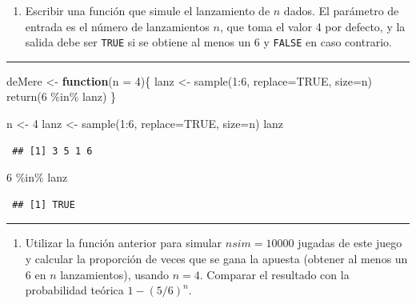 \documentclass[
]{book}
\newenvironment{Shaded}{\begin{snugshade}}{\end{snugshade}}
\newcommand{\AttributeTok}[1]{\textcolor[rgb]{0.77,0.63,0.00}{#1}}
\newcommand{\ConstantTok}[1]{\textcolor[rgb]{0.00,0.00,0.00}{#1}}
\newcommand{\ControlFlowTok}[1]{\textcolor[rgb]{0.13,0.29,0.53}{\textbf{#1}}}
\newcommand{\DecValTok}[1]{\textcolor[rgb]{0.00,0.00,0.81}{#1}}
\newcommand{\FunctionTok}[1]{\textcolor[rgb]{0.00,0.00,0.00}{#1}}
\newcommand{\NormalTok}[1]{#1}
\newcommand{\OtherTok}[1]{\textcolor[rgb]{0.56,0.35,0.01}{#1}}
\newcommand{\SpecialCharTok}[1]{\textcolor[rgb]{0.00,0.00,0.00}{#1}}
\providecommand{\tightlist}{%
  \setlength{\itemsep}{0pt}\setlength{\parskip}{0pt}}
\theoremstyle{break}
\theoremstyle{nonumberplain}
\begin{document}
\begin{enumerate}
\def\labelenumi{\alph{enumi})}
\tightlist
\item
  Escribir una función que simule el lanzamiento de \(n\) dados. El
  parámetro de entrada es el número de lanzamientos \(n\), que toma
  el valor 4 por defecto, y la salida debe ser \texttt{TRUE} si se
  obtiene al menos un 6 y \texttt{FALSE} en caso contrario.
\end{enumerate}

\begin{center}\rule{0.5\linewidth}{0.5pt}\end{center}

\begin{Shaded}
\begin{Highlighting}[]
\NormalTok{deMere }\OtherTok{\textless{}{-}} \ControlFlowTok{function}\NormalTok{(}\AttributeTok{n =} \DecValTok{4}\NormalTok{)\{}
\NormalTok{  lanz }\OtherTok{\textless{}{-}} \FunctionTok{sample}\NormalTok{(}\DecValTok{1}\SpecialCharTok{:}\DecValTok{6}\NormalTok{, }\AttributeTok{replace=}\ConstantTok{TRUE}\NormalTok{, }\AttributeTok{size=}\NormalTok{n)}
  \FunctionTok{return}\NormalTok{(}\DecValTok{6} \SpecialCharTok{\%in\%}\NormalTok{ lanz)}
\NormalTok{\}}

\NormalTok{n }\OtherTok{\textless{}{-}} \DecValTok{4}
\NormalTok{lanz }\OtherTok{\textless{}{-}} \FunctionTok{sample}\NormalTok{(}\DecValTok{1}\SpecialCharTok{:}\DecValTok{6}\NormalTok{, }\AttributeTok{replace=}\ConstantTok{TRUE}\NormalTok{, }\AttributeTok{size=}\NormalTok{n)}
\NormalTok{lanz}
\end{Highlighting}
\end{Shaded}

\begin{verbatim}
 ## [1] 3 5 1 6
\end{verbatim}

\begin{Shaded}
\begin{Highlighting}[]
\DecValTok{6} \SpecialCharTok{\%in\%}\NormalTok{ lanz}
\end{Highlighting}
\end{Shaded}

\begin{verbatim}
 ## [1] TRUE
\end{verbatim}

\begin{center}\rule{0.5\linewidth}{0.5pt}\end{center}

\begin{enumerate}
\def\labelenumi{\alph{enumi})}
\setcounter{enumi}{1}
\tightlist
\item
  Utilizar la función anterior para simular \(nsim=10000\) jugadas
  de este juego y calcular la proporción de veces que se gana la
  apuesta (obtener al menos un 6 en \(n\) lanzamientos), usando
  \(n=4\). Comparar el resultado con la probabilidad teórica
  \(1-(5/6)^{n}\).
\end{enumerate}
\end{document}
